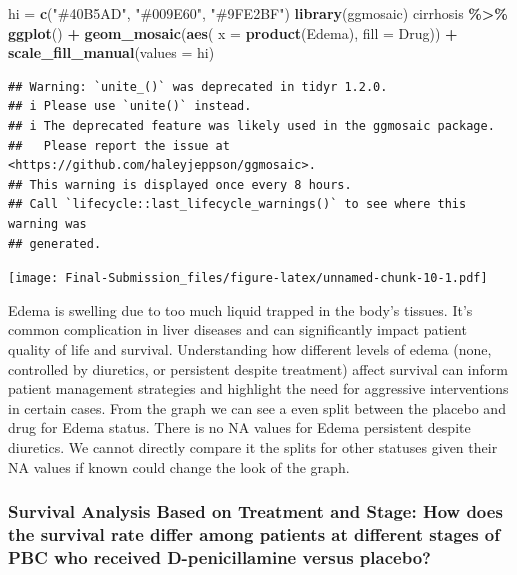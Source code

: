 \documentclass[
]{article}
\newenvironment{Shaded}{\begin{snugshade}}{\end{snugshade}}
\newcommand{\AttributeTok}[1]{\textcolor[rgb]{0.13,0.29,0.53}{#1}}
\newcommand{\FunctionTok}[1]{\textcolor[rgb]{0.13,0.29,0.53}{\textbf{#1}}}
\newcommand{\NormalTok}[1]{#1}
\newcommand{\OtherTok}[1]{\textcolor[rgb]{0.56,0.35,0.01}{#1}}
\newcommand{\SpecialCharTok}[1]{\textcolor[rgb]{0.81,0.36,0.00}{\textbf{#1}}}
\newcommand{\StringTok}[1]{\textcolor[rgb]{0.31,0.60,0.02}{#1}}
\begin{document}
\begin{Shaded}
\begin{Highlighting}[]
\NormalTok{hi }\OtherTok{=} \FunctionTok{c}\NormalTok{(}\StringTok{"\#40B5AD"}\NormalTok{, }\StringTok{"\#009E60"}\NormalTok{, }\StringTok{"\#9FE2BF"}\NormalTok{)}
\FunctionTok{library}\NormalTok{(ggmosaic)}
\NormalTok{cirrhosis }\SpecialCharTok{\%\textgreater{}\%}
  \FunctionTok{ggplot}\NormalTok{() }\SpecialCharTok{+}
  \FunctionTok{geom\_mosaic}\NormalTok{(}\FunctionTok{aes}\NormalTok{( }\AttributeTok{x =} \FunctionTok{product}\NormalTok{(Edema), }\AttributeTok{fill =}\NormalTok{ Drug)) }\SpecialCharTok{+} \FunctionTok{scale\_fill\_manual}\NormalTok{(}\AttributeTok{values =}\NormalTok{ hi)}
\end{Highlighting}
\end{Shaded}

\begin{verbatim}
## Warning: `unite_()` was deprecated in tidyr 1.2.0.
## i Please use `unite()` instead.
## i The deprecated feature was likely used in the ggmosaic package.
##   Please report the issue at <https://github.com/haleyjeppson/ggmosaic>.
## This warning is displayed once every 8 hours.
## Call `lifecycle::last_lifecycle_warnings()` to see where this warning was
## generated.
\end{verbatim}

\texttt{[image: Final-Submission\_files/figure-latex/unnamed-chunk-10-1.pdf]}

Edema is swelling due to too much liquid trapped in the body's tissues.
It's common complication in liver diseases and can significantly impact
patient quality of life and survival. Understanding how different levels
of edema (none, controlled by diuretics, or persistent despite
treatment) affect survival can inform patient management strategies and
highlight the need for aggressive interventions in certain cases. From
the graph we can see a even split between the placebo and drug for Edema
status. There is no NA values for Edema persistent despite diuretics. We
cannot directly compare it the splits for other statuses given their NA
values if known could change the look of the graph.

\hypertarget{survival-analysis-based-on-treatment-and-stage-how-does-the-survival-rate-differ-among-patients-at-different-stages-of-pbc-who-received-d-penicillamine-versus-placebo}{%
\subsubsection{Survival Analysis Based on Treatment and Stage: How does
the survival rate differ among patients at different stages of PBC who
received D-penicillamine versus
placebo?}\label{survival-analysis-based-on-treatment-and-stage-how-does-the-survival-rate-differ-among-patients-at-different-stages-of-pbc-who-received-d-penicillamine-versus-placebo}}
\end{document}
